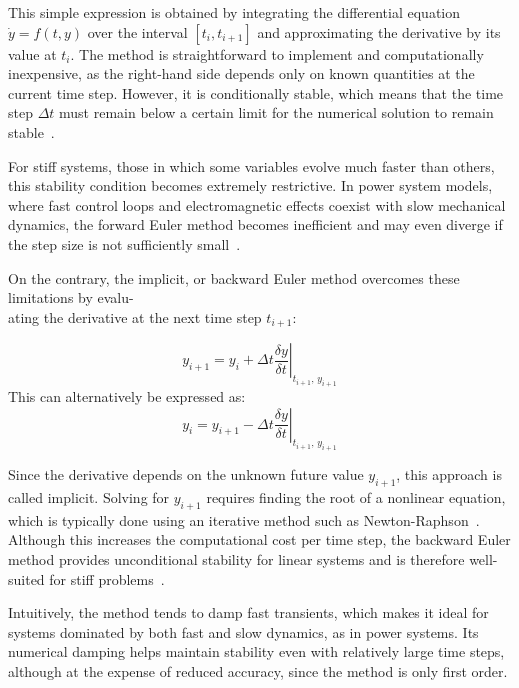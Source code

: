 This simple expression is obtained by integrating the differential equation
$\dot{y} = f(t, y)$ over the interval $[t_i, t_{i+1}]$ and approximating the derivative by its value at $t_i$. The method is straightforward to implement and
computationally inexpensive, as the right-hand side depends only on known quantities at the current time step. However, it is conditionally stable,
which means that the time step $\Delta t$ must remain below a certain limit for the numerical solution to remain stable~\cite{Butcher2008}. 

For stiff systems, those in which some variables evolve much faster than others, this stability condition becomes extremely restrictive.
In power system models, where fast control loops and electromagnetic effects coexist with slow mechanical dynamics, the forward Euler method becomes inefficient and may
even diverge if the step size is not sufficiently small~\cite{LaraTDS}.

On the contrary, the implicit, or backward Euler method overcomes these limitations by evalu-\\ating the derivative at the next time step $t_{i+1}$:

\begin{equation}
    y_{i+1} = y_i + \Delta t \left.\frac{\delta y}{\delta t}\right|_{t_{i+1}, \, y_{i+1}}
    \label{eq:backward_euler}
\end{equation}
This can alternatively be expressed as:
\begin{equation}
    y_i = y_{i+1} - \Delta t \left.\frac{\delta y}{\delta t}\right|_{t_{i+1}, \, y_{i+1}}
\end{equation}

Since the derivative depends on the unknown future value $y_{i+1}$, this approach is called implicit. Solving for $y_{i+1}$ requires finding the root of a
nonlinear equation, which is typically done using an iterative method such as Newton-Raphson~\cite{Hindmarsh1995}. Although this increases the computational cost per
time step, the backward Euler method provides unconditional stability for linear systems and is therefore well-suited for stiff problems~\cite{Butcher2008}. 

Intuitively, the method tends to damp fast transients, which makes it ideal for systems dominated by both fast and slow dynamics, as in power systems.
Its numerical damping helps maintain stability even with relatively large time steps, although at the expense of reduced accuracy, since the method is only first order.

